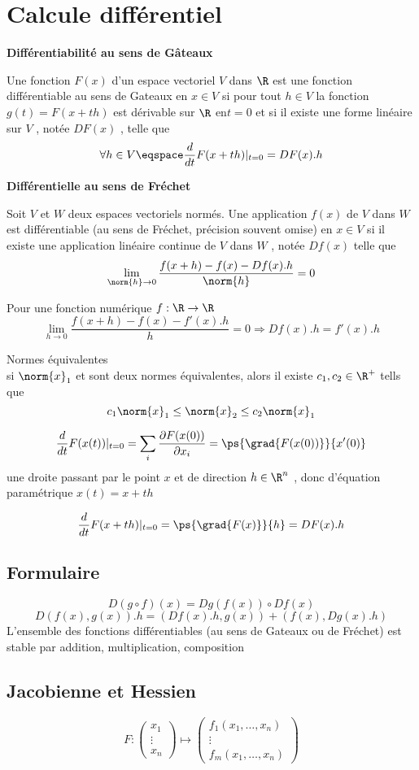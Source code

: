 \documentclass{article}
\begin{document}
\section{Calcule diff\'erentiel}
\textbf{Diff\'erentiabilit\'e au sens de G\^ateaux}
\begin{definition}
Une fonction $F(x)$ d'un espace vectoriel $ V$  dans $\R$ est
une fonction diff\'erentiable au sens de Gateaux en $ x\in V$  si pour tout $ h \in V$  la fonction $ g(t) = F(x+th)$  est d\'erivable sur $\R$ en$
t = 0 $ et si il existe une forme lin\'eaire sur $ V$  , not\'ee $ DF(x)$ , telle que
$$
\forall h \in V \eqspace \frac{d}{d t}F(x+th)|_{t = 0} = DF(x).h
$$
\end{definition}

\textbf{Diff\'erentielle au sens de Fr\'echet}
\begin{definition}
		Soit $V$ et $W$ deux espaces vectoriels norm\'es.
Une application $ f(x)$ de $V$  dans $W$  est diff\'erentiable (au sens de Fr\'echet, pr\'ecision souvent omise) en $x \in V$  si il existe
une application lin\'eaire continue de $V$ dans $W$ , not\'ee $Df(x)$ telle que
$$
\lim_{\norm{h}\to 0}  \frac{ f(x+h) - f(x) - Df(x).h}{\norm{h}} = 0
$$
\end{definition}
Pour une fonction num\'erique $f:\R \to \R$
$$
\lim_{h \to 0} \frac{ f(x+h) - f(x) - f'(x).h}{h} = 0 \Rightarrow
Df(x).h = f'(x).h
$$

Normes \'equivalentes \\
si 
$\norm{x}_1$
et 
sont deux normes \'equivalentes, alors il existe $c_1,c_2 \in \R^+$ tells que
$$
c_1 \norm{x}_1 \leq \norm{x}_2 \leq c_2 \norm{x}_1
$$

$$
\frac{d}{dt}F(x(t))|_{t = 0} 
= \sum_i \frac{\partial F(x(0))}{\partial x_i}
= \ps{\grad{F(x(0))}}{x'(0)}
$$
une droite passant par le point $x$ et de direction $ h \in \R^n$ , donc d'\'equation param\'etrique $ x(t) = x + th$ 

$$
\frac{d}{dt}F(x+th)|_{t = 0} 
= \ps{\grad{F(x)}}{h}
= DF(x).h
$$

\subsection{Formulaire}
$$ D(g\circ f)(x) = Dg(f(x)) \circ Df(x) $$
$$ D(f(x),g(x)).h = (Df(x).h, g(x)) + (f(x), Dg(x).h)$$
L'ensemble des fonctions diff\'erentiables (au sens de Gateaux ou de Fr\'echet) est stable par addition, multiplication, composition

\subsection{Jacobienne et Hessien}
$$
F :
\begin{pmatrix}
	x_1\\\vdots\\x_n
\end{pmatrix} 
\longmapsto 
\begin{pmatrix}
f_1(x_1,\dots,x_n)\\
\vdots\\
f_m(x_1,\dots,x_n)
\end{pmatrix}
$$
\end{document}
